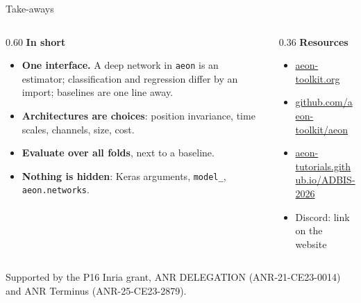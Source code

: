 \documentclass[aspectratio=169,10pt]{beamer}
\begin{document}
\begin{frame}{Take-aways}
  \begin{columns}[t]
    \begin{column}{0.60\textwidth}
      \textbf{In short}
      \begin{itemize}
        \item \textbf{One interface.} A deep network in \texttt{aeon} is an estimator; classification and regression differ by an import; baselines are one line away.
        \item \textbf{Architectures are choices}: position invariance, time scales, channels, size, cost.
        \item \textbf{Evaluate over all folds}, next to a baseline.
        \item \textbf{Nothing is hidden}: Keras arguments, \texttt{model\_}, \texttt{aeon.networks}.
      \end{itemize}
    \end{column}
    \begin{column}{0.36\textwidth}
      \textbf{Resources}
      {\small
      \begin{itemize}
        \item \href{https://www.aeon-toolkit.org}{aeon-toolkit.org}
        \item \href{https://github.com/aeon-toolkit/aeon}{github.com/aeon-toolkit/aeon}
        \item \href{https://aeon-tutorials.github.io/ADBIS-2026/}{aeon-tutorials.github.io/ADBIS-2026}
        \item Discord: link on the website
      \end{itemize}}
    \end{column}
  \end{columns}
  \vfill
  {\scriptsize\color{muted} Supported by the P16 Inria grant, ANR DELEGATION (ANR-21-CE23-0014) and ANR Terminus (ANR-25-CE23-2879).\par}
  \vspace{0.1cm}
\end{frame}
\end{document}
